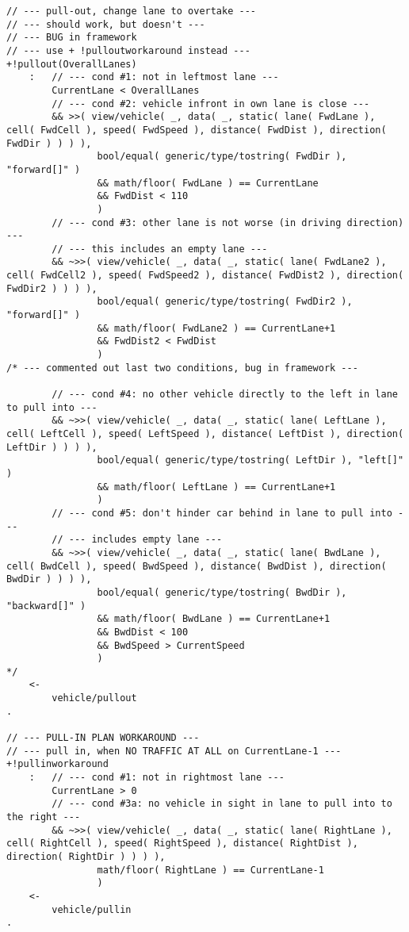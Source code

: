 \begin{lstlisting}
// --- pull-out, change lane to overtake ---
// --- should work, but doesn't ---
// --- BUG in framework
// --- use + !pulloutworkaround instead ---
+!pullout(OverallLanes)
    :   // --- cond #1: not in leftmost lane ---
        CurrentLane < OverallLanes 
        // --- cond #2: vehicle infront in own lane is close ---
        && >>( view/vehicle( _, data( _, static( lane( FwdLane ), cell( FwdCell ), speed( FwdSpeed ), distance( FwdDist ), direction( FwdDir ) ) ) ),
                bool/equal( generic/type/tostring( FwdDir ), "forward[]" ) 
                && math/floor( FwdLane ) == CurrentLane
                && FwdDist < 110 
                )
        // --- cond #3: other lane is not worse (in driving direction) ---
        // --- this includes an empty lane ---
        && ~>>( view/vehicle( _, data( _, static( lane( FwdLane2 ), cell( FwdCell2 ), speed( FwdSpeed2 ), distance( FwdDist2 ), direction( FwdDir2 ) ) ) ),
                bool/equal( generic/type/tostring( FwdDir2 ), "forward[]" ) 
                && math/floor( FwdLane2 ) == CurrentLane+1
                && FwdDist2 < FwdDist 
                )
/* --- commented out last two conditions, bug in framework --- 

        // --- cond #4: no other vehicle directly to the left in lane to pull into ---
        && ~>>( view/vehicle( _, data( _, static( lane( LeftLane ), cell( LeftCell ), speed( LeftSpeed ), distance( LeftDist ), direction( LeftDir ) ) ) ),
                bool/equal( generic/type/tostring( LeftDir ), "left[]" ) 
                && math/floor( LeftLane ) == CurrentLane+1
                )
        // --- cond #5: don't hinder car behind in lane to pull into ---
        // --- includes empty lane ---
        && ~>>( view/vehicle( _, data( _, static( lane( BwdLane ), cell( BwdCell ), speed( BwdSpeed ), distance( BwdDist ), direction( BwdDir ) ) ) ),
                bool/equal( generic/type/tostring( BwdDir ), "backward[]" ) 
                && math/floor( BwdLane ) == CurrentLane+1
                && BwdDist < 100
                && BwdSpeed > CurrentSpeed 
                )
*/
    <-
        vehicle/pullout
.

// --- PULL-IN PLAN WORKAROUND ---
// --- pull in, when NO TRAFFIC AT ALL on CurrentLane-1 --- 
+!pullinworkaround
    :   // --- cond #1: not in rightmost lane ---
        CurrentLane > 0
        // --- cond #3a: no vehicle in sight in lane to pull into to the right ---
        && ~>>( view/vehicle( _, data( _, static( lane( RightLane ), cell( RightCell ), speed( RightSpeed ), distance( RightDist ), direction( RightDir ) ) ) ),
                math/floor( RightLane ) == CurrentLane-1 
                )
    <-
        vehicle/pullin
.


\end{lstlisting}
